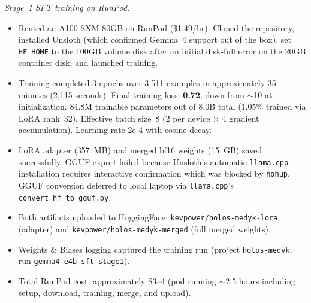 \documentclass{article}
\theoremstyle{plain}
\theoremstyle{definition}
\theoremstyle{remark}
\begin{document}
\textit{Stage~1 SFT training on RunPod.}
\begin{itemize}
\item Rented an A100 SXM 80GB on RunPod (\$1.49/hr). Cloned the repository, installed Unsloth (which confirmed Gemma~4 support out of the box), set \texttt{HF\_HOME} to the 100GB volume disk after an initial disk-full error on the 20GB container disk, and launched training.
\item Training completed 3 epochs over 3{,}511 examples in approximately 35 minutes (2{,}115 seconds). Final training loss: \textbf{0.72}, down from $\sim$10 at initialization. 84.8M trainable parameters out of 8.0B total (1.05\% trained via LoRA rank~32). Effective batch size~8 (2 per device $\times$ 4 gradient accumulation). Learning rate 2e-4 with cosine decay.
\item LoRA adapter (357~MB) and merged bf16 weights (15~GB) saved successfully. GGUF export failed because Unsloth's automatic \texttt{llama.cpp} installation requires interactive confirmation which was blocked by \texttt{nohup}. GGUF conversion deferred to local laptop via \texttt{llama.cpp}'s \texttt{convert\_hf\_to\_gguf.py}.
\item Both artifacts uploaded to HuggingFace: \texttt{kevpower/holos-medyk-lora} (adapter) and \texttt{kevpower/holos-medyk-merged} (full merged weights).
\item Weights \& Biases logging captured the training run (project \texttt{holos-medyk}, run \texttt{gemma4-e4b-sft-stage1}).
\item Total RunPod cost: approximately \$3--4 (pod running $\sim$2.5 hours including setup, download, training, merge, and upload).
\end{itemize}
\end{document}

